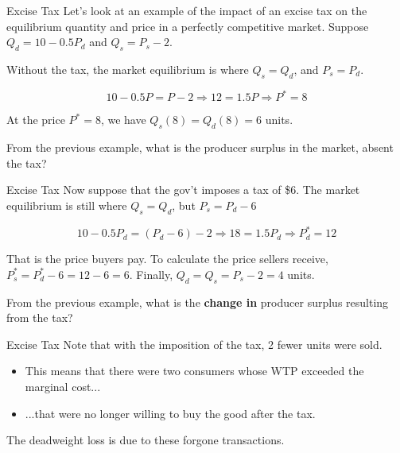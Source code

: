 \documentclass[11pt,t]{beamer}
\begin{document}
\begin{frame}{Excise Tax}
  Let's look at an example of the impact of an excise tax on the equilibrium quantity and price in a perfectly competitive market. Suppose $Q_d = 10 - 0.5 P_d$ and $Q_s = P_s - 2$.

  \bigskip
  Without the tax, the market equilibrium is where $Q_s = Q_d$, and $P_s = P_d$.

  \pause
  $$
    10 - 0.5P = P - 2 \Rightarrow 12 = 1.5P \Rightarrow P^* = 8
  $$

  At the price $P^* = 8$, we have $Q_s(8) = Q_d(8) = 6$ units.
\end{frame}

\begin{frame}{}
  From the previous example, what is the producer surplus in the market, absent the tax?
\end{frame}

\begin{frame}{Excise Tax}
  Now suppose that the gov't imposes a tax of \$6. The market equilibrium is still where $Q_s = Q_d$, but $P_s = P_d - 6$
  
  \pause
  $$
  10 - 0.5P_d = (P_d - 6) - 2  \Rightarrow 18 = 1.5P_d \Rightarrow P_d^* = 12 
  $$

  \pause\medskip
  That is the price buyers pay. To calculate the price sellers receive, $P_s^* = P_d^* - 6 = 12 - 6 = 6$. Finally, $Q_d = Q_s = P_s - 2 = 4$ units.
\end{frame}

\begin{frame}{}
  From the previous example, what is the \textbf{change in} producer surplus resulting from the tax?
\end{frame}

\begin{frame}{Excise Tax}
  Note that with the imposition of the tax, 2 fewer units were sold.

  \begin{itemize}
    \item This means that there were two consumers whose WTP exceeded the marginal cost...
    \item ...that were no longer willing to buy the good after the tax.
  \end{itemize}

  \bigskip
  The deadweight loss is due to these forgone transactions.
\end{frame}
\end{document}
